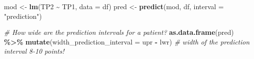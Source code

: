 \documentclass[
]{article}
\newenvironment{Shaded}{\begin{snugshade}}{\end{snugshade}}
\newcommand{\AttributeTok}[1]{\textcolor[rgb]{0.13,0.29,0.53}{#1}}
\newcommand{\CommentTok}[1]{\textcolor[rgb]{0.56,0.35,0.01}{\textit{#1}}}
\newcommand{\FunctionTok}[1]{\textcolor[rgb]{0.13,0.29,0.53}{\textbf{#1}}}
\newcommand{\NormalTok}[1]{#1}
\newcommand{\OtherTok}[1]{\textcolor[rgb]{0.56,0.35,0.01}{#1}}
\newcommand{\SpecialCharTok}[1]{\textcolor[rgb]{0.81,0.36,0.00}{\textbf{#1}}}
\newcommand{\StringTok}[1]{\textcolor[rgb]{0.31,0.60,0.02}{#1}}
\begin{document}
\begin{Shaded}
\begin{Highlighting}[]
\NormalTok{mod }\OtherTok{\textless{}{-}} \FunctionTok{lm}\NormalTok{(TP2 }\SpecialCharTok{\textasciitilde{}}\NormalTok{ TP1, }\AttributeTok{data =}\NormalTok{ df)}
\NormalTok{pred }\OtherTok{\textless{}{-}} \FunctionTok{predict}\NormalTok{(mod, df, }\AttributeTok{interval =} \StringTok{"prediction"}\NormalTok{)}

\CommentTok{\# How wide are the prediction intervals for a patient?}
\FunctionTok{as.data.frame}\NormalTok{(pred) }\SpecialCharTok{\%\textgreater{}\%} \FunctionTok{mutate}\NormalTok{(}\AttributeTok{width\_prediction\_interval =}\NormalTok{ upr }\SpecialCharTok{{-}}\NormalTok{ lwr) }\CommentTok{\# width of the prediction interval 8{-}10 points!}
\end{Highlighting}
\end{Shaded}
\end{document}
